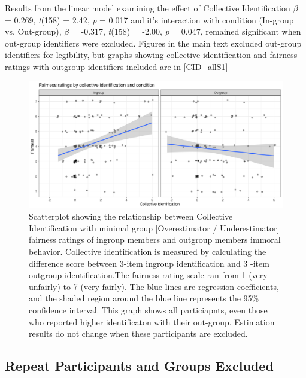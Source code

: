 \documentclass[12pt,]{article}
\begin{document}
\clearpage

Results from the linear model examining the effect of Collective Identification $\beta$ = 0.269, \emph{t}(158) = 2.42, \emph{p} = 0.017 and it's interaction with condition (In-group vs. Out-group), $\beta$ = -0.317, \emph{t}(158) = -2.00, \emph{p} = 0.047, remained significant when out-group identifiers were excluded. Figures in the main text excluded out-group identifiers for legibility, but graphs showing collective identification and fairness ratings with outgroup identifiers included are in \cref{CID_allS1}


\begin{figure}
	\centering
	\includegraphics{Plots/Study1_CI_all.png}
	\caption{Scatterplot showing the relationship between Collective Identification with minimal group [Overestimator / Underestimator] fairness ratings of ingroup members and outgroup members immoral behavior. Collective identification is measured by calculating the difference score between 3-item ingroup identification and 3 -item outgroup identification.The fairness rating scale ran from 1 (very unfairly) to 7 (very fairly). The blue lines are regression coefficients, and the shaded region around the blue line represents the 95\% confidence interval. This graph shows all particiapnts, even those who reported higher identificaton with their out-group. Estimation results do not change when these participants are excluded. }
	\label{fig:CID_allS1}
\end{figure}



\newpage
\subsection{Repeat Participants and Groups Excluded}
\label{appendix:repeat1}
\end{document}

